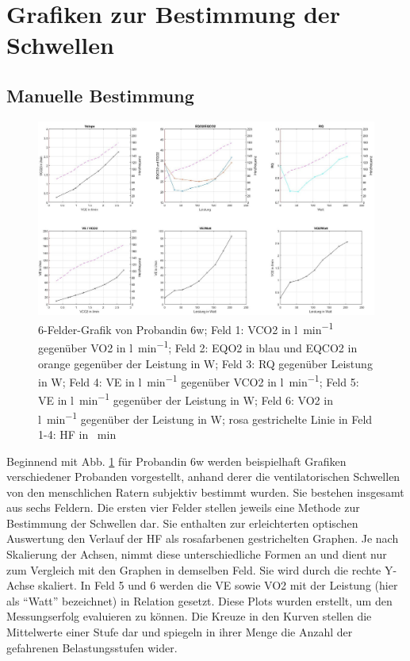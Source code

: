 \section{Grafiken zur Bestimmung der Schwellen}
%
\subsection{Manuelle Bestimmung}
%
\begin{figure}[H]
	\centering
	\includegraphics[width=\textwidth]{Bilder/plot_6w.jpg}
	\caption[6-Felder-Grafik von Probandin 6w]{6-Felder-Grafik von Probandin 6w; Feld 1: \acs{VCO2} in \si{\litre\per\minute} gegenüber \acs{VO2} in \si{\litre\per\minute}; Feld 2: \acs{EQO2} in blau und \acs{EQCO2} in orange gegenüber der Leistung in \si{\watt}; Feld 3: \acs{RQ} gegenüber Leistung in \si{\watt}; Feld 4: \acs{VE} in \si{\litre\per\minute} gegenüber \acs{VCO2} in \si{\litre\per\minute}; Feld 5: \acs{VE} in \si{\litre\per\minute} gegenüber der Leistung in \si{\watt}; Feld 6: \acs{VO2} in \si{\litre\per\minute} gegenüber der Leistung in \si{\watt}; rosa gestrichelte Linie in Feld 1-4: \acs{HF} in \si{\per\minute}}
	\label{pic:pic15}
\end{figure}
%
Beginnend mit Abb. \ref{pic:pic15} für Probandin 6w werden beispielhaft Grafiken verschiedener Probanden vorgestellt, anhand derer die ventilatorischen Schwellen von den menschlichen Ratern subjektiv bestimmt wurden. Sie bestehen insgesamt aus sechs Feldern. Die ersten vier Felder stellen jeweils eine Methode zur Bestimmung der Schwellen dar. Sie enthalten zur erleichterten optischen Auswertung den Verlauf der \acs{HF} als rosafarbenen gestrichelten Graphen. Je nach Skalierung der Achsen, nimmt diese unterschiedliche Formen an und dient nur zum Vergleich mit den Graphen in demselben Feld. Sie wird durch die rechte Y-Achse skaliert. In Feld 5 und 6 werden die \acs{VE} sowie \acs{VO2} mit der Leistung (hier als "`Watt"' bezeichnet) in Relation gesetzt. Diese Plots wurden erstellt, um den Messungserfolg evaluieren zu können. Die Kreuze in den Kurven stellen die Mittelwerte einer Stufe dar und spiegeln in ihrer Menge die Anzahl der gefahrenen Belastungsstufen wider.

